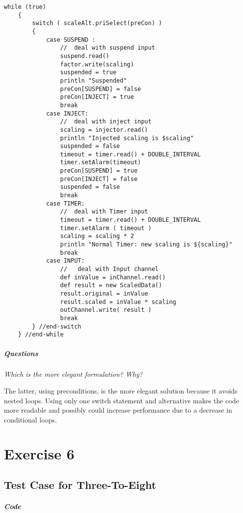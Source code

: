 \documentclass[10pt, a4paper]{article}
\begin{document}
	\begin{lstlisting}[caption = "Scale.groovy"]
	while (true)
	{
		switch ( scaleAlt.priSelect(preCon) )
		{
			case SUSPEND :
				//  deal with suspend input      
				suspend.read()
				factor.write(scaling)
				suspended = true
				println "Suspended"		
				preCon[SUSPEND] = false
				preCon[INJECT] = true  
				break
			case INJECT:
				//  deal with inject input
				scaling = injector.read()
				println "Injected scaling is $scaling"
				suspended = false
				timeout = timer.read() + DOUBLE_INTERVAL
				timer.setAlarm(timeout)
				preCon[SUSPEND] = true
				preCon[INJECT] = false
				suspended = false
				break
			case TIMER:
				//  deal with Timer input
				timeout = timer.read() + DOUBLE_INTERVAL
				timer.setAlarm ( timeout )
				scaling = scaling * 2
				println "Normal Timer: new scaling is ${scaling}"
				break
			case INPUT:
				//   deal with Input channel 
				def inValue = inChannel.read()
				def result = new ScaledData()
				result.original = inValue
				result.scaled = inValue * scaling
				outChannel.write( result )
				break
		} //end-switch
	} //end-while		\end{lstlisting}
	
	\subparagraph{Questions} \hfill
	
	\textit{Which is the more elegant formulation? Why?}
   
   The latter, using preconditions, is the more elegant solution because it avoids nested loops. Using only one switch statement and alternative makes the code more readable and possibly could increase performance due to a decrease in conditional loops.
   
   	\setcounter{section}{6}
   \section*{Exercise 6}
   
   \setcounter{subsection}{0}
   \subsection{Test Case for Three-To-Eight} \hfill
   
   \subparagraph{Code} \hfill
   
\end{document}
